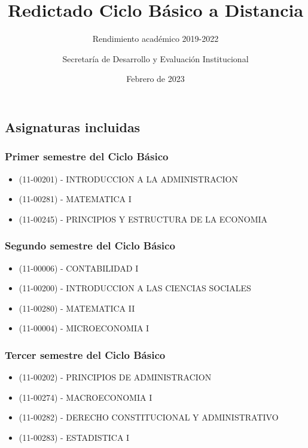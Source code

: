 \documentclass[
]{article}
\title{Redictado Ciclo Básico a Distancia}
\subtitle{Rendimiento académico 2019-2022}
\author{Secretaría de Desarrollo y Evaluación Institucional}
\date{Febrero de 2023}
\begin{document}
\maketitle

\hypertarget{asignaturas-incluidas}{%
\subsection{Asignaturas incluidas}\label{asignaturas-incluidas}}

\hypertarget{primer-semestre-del-ciclo-buxe1sico}{%
\subsubsection{Primer semestre del Ciclo
Básico}\label{primer-semestre-del-ciclo-buxe1sico}}

\begin{itemize}
\item
  (11-00201) - INTRODUCCION A LA ADMINISTRACION
\item
  (11-00281) - MATEMATICA I
\item
  (11-00245) - PRINCIPIOS Y ESTRUCTURA DE LA ECONOMIA
\end{itemize}

\hypertarget{segundo-semestre-del-ciclo-buxe1sico}{%
\subsubsection{Segundo semestre del Ciclo
Básico}\label{segundo-semestre-del-ciclo-buxe1sico}}

\begin{itemize}
\item
  (11-00006) - CONTABILIDAD I
\item
  (11-00200) - INTRODUCCION A LAS CIENCIAS SOCIALES
\item
  (11-00280) - MATEMATICA II
\item
  (11-00004) - MICROECONOMIA I
\end{itemize}

\hypertarget{tercer-semestre-del-ciclo-buxe1sico}{%
\subsubsection{Tercer semestre del Ciclo
Básico}\label{tercer-semestre-del-ciclo-buxe1sico}}

\begin{itemize}
\item
  (11-00202) - PRINCIPIOS DE ADMINISTRACION
\item
  (11-00274) - MACROECONOMIA I
\item
  (11-00282) - DERECHO CONSTITUCIONAL Y ADMINISTRATIVO
\item
  (11-00283) - ESTADISTICA I
\end{itemize}
\end{document}
